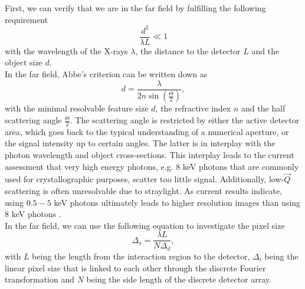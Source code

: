First, we can verify that we are in the far field by fulfilling the following requirement \cite{Williams-2010-NJP}
\begin{equation}
\frac{d^{2}}{\lambda L} \ll 1
\label{eq:far-field-test}
\end{equation}
with the wavelength of the X-rays $\lambda$, the distance to the detector $L$ and the object size $d$.\\
In the far field, Abbe's criterion can be written down as
\begin{equation}
    d = \frac{\lambda}{2n \sin(\frac{\Theta}{2})},
		\label{eq:abbe-criterion}
\end{equation}
with the minimal resolvable feature size $d$, the refractive index $n$ and the half scattering angle $\frac{\Theta}{2}$. The scattering angle is restricted by either the active detector area, which goes back to the typical understanding of a numerical aperture, or the signal intensity up to certain angles. The latter is in interplay with the photon wavelength and object cross-sections. This interplay leads to the current assessment that very high energy photons, e.g. $8$ keV photons that are commonly used for crystallographic purposes, scatter too little signal. Additionally, low-$\vec{Q}$ scattering is often unresolvable due to straylight. As current results indicate, using $0.5-5$ keV photons ultimately leads to higher resolution images than using $8$ keV photons \citep{Aquila-2015-StrucDyn}.\\
In the far field, we can use the following equation to investigate the pixel size \cite{Williams-2010-NJP}
\begin{equation}
    \Delta_{s} = \frac{\lambda L}{N \Delta_{d}},
\label{eq:relation-pixel-fourier}
\end{equation}
with $L$ being the length from the interaction region to the detector, $\Delta_{i}$ being the linear pixel size that is linked to each other through the discrete Fourier transformation and $N$ being the side length of the discrete detector array.\\
